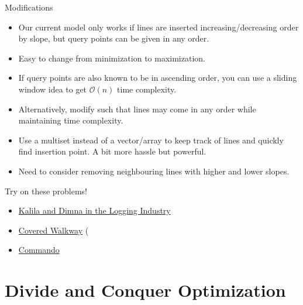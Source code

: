 \documentclass{beamer}
\begin{document}
\begin{frame}[plain]{Modifications}
    \begin{itemize}
        \item<1-> Our current model only works if lines are inserted increasing/decreasing order by slope, but query points can be given in any order.
        \item<2-> Easy to change from minimization to maximization.
        \item<3-> If query points are also known to be in ascending order, you can use a sliding window idea to get $\mathcal{O}(n)$ time complexity.
        \item<4-> Alternatively, modify such that lines may come in any order while maintaining time complexity.
        \item<5-> Use a multiset instead of a vector/array to keep track of lines and quickly find insertion point. A bit more hassle but powerful.
        \item<6-> Need to consider removing neighbouring lines with higher and lower slopes.
    \end{itemize}
\end{frame}

\begin{frame}{Try on these problems!}
    \begin{itemize}
        \item \href{https://codeforces.com/contest/319/problem/C}{Kalila and Dimna in the Logging Industry}
        \item \href{https://open.kattis.com/problems/coveredwalkway}{Covered Walkway} (
        \item \href{https://dmoj.ca/problem/apio10p1}{Commando}
    \end{itemize}
\end{frame}

\section*{Divide and Conquer Optimization}
\end{document}
